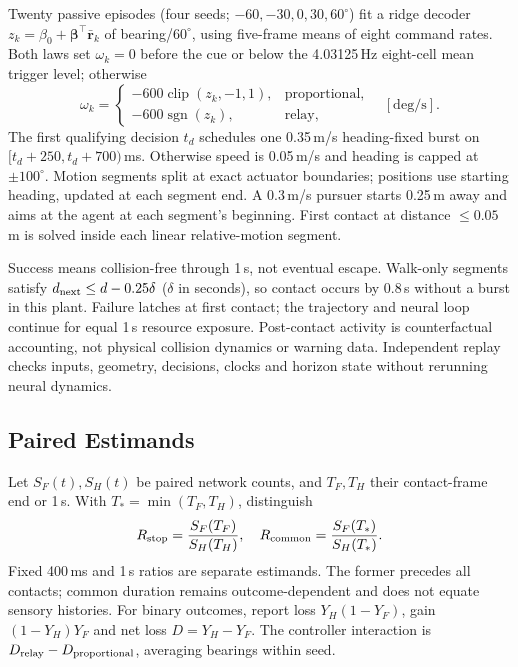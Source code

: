 Twenty passive episodes (four seeds; $-60,-30,0,30,60^\circ$) fit a ridge decoder $z_k=\beta_0+\boldsymbol\beta^\top\bar{\mathbf r}_k$ of bearing/$60^\circ$, using five-frame means of eight command rates. Both laws set $\omega_k=0$ before the cue or below the 4.03125\,Hz eight-cell mean trigger level; otherwise
\begin{equation}
\omega_k=\begin{cases}
-600\operatorname{clip}(z_k,-1,1),&\text{proportional},\\
-600\operatorname{sgn}(z_k),&\text{relay},
\end{cases}\quad[\mathrm{deg/s}].
\end{equation}
The first qualifying decision $t_d$ schedules one 0.35\,m/s heading-fixed burst on $[t_d+250,t_d+700)$\,ms. Otherwise speed is 0.05\,m/s and heading is capped at $\pm100^\circ$. Motion segments split at exact actuator boundaries; positions use starting heading, updated at each segment end. A 0.3\,m/s pursuer starts 0.25\,m away and aims at the agent at each segment's beginning. First contact at distance $\leq0.05$\,m is solved inside each linear relative-motion segment.

Success means collision-free through 1\,s, not eventual escape. Walk-only segments satisfy $d_{\rm next}\leq d-0.25\delta$ ($\delta$ in seconds), so contact occurs by 0.8\,s without a burst in this plant. Failure latches at first contact; the trajectory and neural loop continue for equal 1\,s resource exposure. Post-contact activity is counterfactual accounting, not physical collision dynamics or warning data. Independent replay checks inputs, geometry, decisions, clocks and horizon state without rerunning neural dynamics.

\subsection{Paired Estimands}
Let $S_F(t),S_H(t)$ be paired network counts, and $T_F,T_H$ their contact-frame end or 1\,s. With $T_*=\min(T_F,T_H)$, distinguish
\begin{equation}
R_{\rm stop}=\frac{S_F(T_F)}{S_H(T_H)},\quad
R_{\rm common}=\frac{S_F(T_*)}{S_H(T_*)}.
\end{equation}
Fixed 400\,ms and 1\,s ratios are separate estimands. The former precedes all contacts; common duration remains outcome-dependent and does not equate sensory histories. For binary outcomes, report loss $Y_H(1-Y_F)$, gain $(1-Y_H)Y_F$ and net loss $D=Y_H-Y_F$. The controller interaction is $D_{\rm relay}-D_{\rm proportional}$, averaging bearings within seed.

